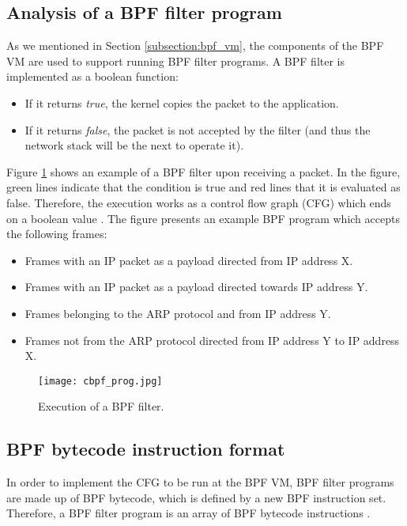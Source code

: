 \subsection{Analysis of a BPF filter program} \label{subsection:analysis_bpf_filter_prog}
As we mentioned in Section \ref{subsection:bpf_vm}, the components of the BPF VM are used to support running BPF filter programs. A BPF filter is implemented as a boolean function:
\begin{itemize}
\item If it returns \textit{true}, the kernel copies the packet to the application.
\item If it returns \textit{false}, the packet is not accepted by the filter (and thus the network stack will be the next to operate it).
\end{itemize}

Figure \ref{fig:cbpf_prog} shows an example of a BPF filter upon receiving a packet. In the figure, green lines indicate that the condition is true and red lines that it is evaluated as false. Therefore, the execution works as a control flow graph (CFG) which ends on a boolean value \cite{bpf_bsd_origin_bpf_page5}. The figure presents an example BPF program which accepts the following frames:
\begin{itemize}
\item Frames with an IP packet as a payload directed from IP address X.
\item Frames with an IP packet as a payload directed towards IP address Y.
\item Frames belonging to the ARP protocol and from IP address Y.
\item Frames not from the ARP protocol directed from IP address Y to IP address X.
\end{itemize}

\begin{figure}[ht]
	\centering
	\texttt{[image: cbpf\_prog.jpg]}
	\caption{Execution of a BPF filter.}
	\label{fig:cbpf_prog}
\end{figure}


\subsection{BPF bytecode instruction format}
In order to implement the CFG to be run at the BPF VM, BPF filter programs are made up of BPF bytecode, which is defined by a new BPF instruction set. Therefore, a BPF filter program is an array of BPF bytecode instructions \cite{bpf_organicprogrammer_analysis}.


